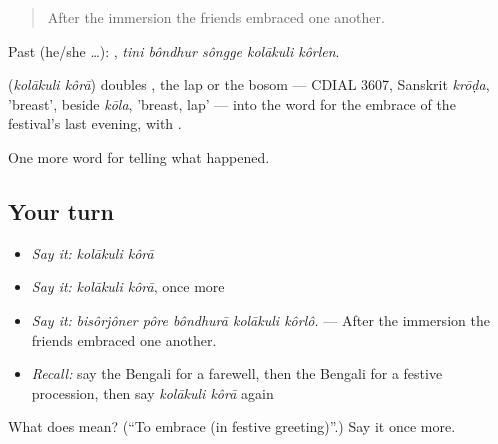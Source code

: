 \begin{quote}
After the immersion the friends embraced one another.
\end{quote}

Past (he/she …):     , \emph{tini bôndhur sôngge kolākuli kôrlen}.

\begin{cousinweb}
\textbf{ } (\emph{kolākuli kôrā}) doubles , the lap or the bosom — CDIAL 3607, Sanskrit \emph{krōḍa}, 'breast', beside \emph{kōla}, 'breast, lap' — into the word for the embrace of the festival's last evening, with .
\end{cousinweb}

\begin{grammarlens}[title={What you've built}]
One more word for telling what happened.
\end{grammarlens}

\subsection*{Your turn}
\begin{itemize}
\raggedright
  \item \emph{Say it:} \emph{kolākuli kôrā}
  \item \emph{Say it:} \emph{kolākuli kôrā}, once more
  \item \emph{Say it:} \emph{bisôrjôner pôre bôndhurā kolākuli kôrlô.} — After the immersion the friends embraced one another.
  \item \emph{Recall:} say the Bengali for a farewell, then the Bengali for a festive procession, then say \emph{kolākuli kôrā} again
\end{itemize}

\begin{tcolorbox}[breakable,colback=teal!4,colframe=teal!35!black,title={Before you move on}]
What does   mean? (\textquotedblleft{}To embrace (in festive greeting)\textquotedblright{}.) Say it once more.
\end{tcolorbox}

